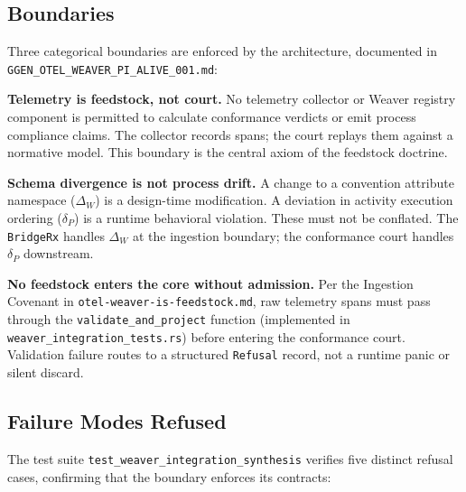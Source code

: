 \subsection{Boundaries}
\label{sec:otel-weaver-exp-004-registry-to-witness-boundaries}

Three categorical boundaries are enforced by the architecture, documented in
\texttt{GGEN\_OTEL\_WEAVER\_PI\_ALIVE\_001.md}:

\textbf{Telemetry is feedstock, not court.} No telemetry collector or Weaver registry
component is permitted to calculate conformance verdicts or emit process compliance claims.
The collector records spans; the court replays them against a normative model. This
boundary is the central axiom of the feedstock doctrine.

\textbf{Schema divergence is not process drift.} A change to a convention attribute
namespace ($\Delta_W$) is a design-time modification. A deviation in activity execution
ordering ($\delta_P$) is a runtime behavioral violation. These must not be conflated.
The \texttt{BridgeRx} handles $\Delta_W$ at the ingestion boundary; the conformance court
handles $\delta_P$ downstream.

\textbf{No feedstock enters the core without admission.} Per the Ingestion Covenant in
\texttt{otel-weaver-is-feedstock.md}, raw telemetry spans must pass through the
\texttt{validate\_and\_project} function (implemented in \texttt{weaver\_integration\_tests.rs})
before entering the conformance court. Validation failure routes to a structured
\texttt{Refusal} record, not a runtime panic or silent discard.

\subsection{Failure Modes Refused}
\label{sec:otel-weaver-exp-004-registry-to-witness-refusals}

The test suite \texttt{test\_weaver\_integration\_synthesis} verifies five distinct
refusal cases, confirming that the boundary enforces its contracts:

